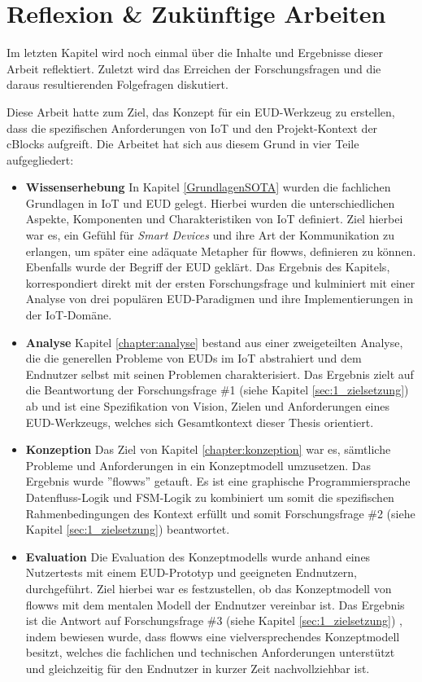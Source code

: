 \chapter{Reflexion \& Zukünftige Arbeiten}
Im letzten Kapitel wird noch einmal über die Inhalte und Ergebnisse dieser Arbeit reflektiert. Zuletzt wird das Erreichen der Forschungsfragen und die daraus resultierenden Folgefragen diskutiert.

Diese Arbeit hatte zum Ziel, das Konzept für ein \ac{EUD}-Werkzeug zu erstellen, dass die spezifischen Anforderungen von \ac{IoT} und den Projekt-Kontext der \acp{cBlock} aufgreift. Die Arbeitet hat sich aus diesem Grund in vier Teile aufgegliedert:

\begin{itemize}
    \item \textbf{Wissenserhebung} In Kapitel \ref{GrundlagenSOTA} wurden die fachlichen Grundlagen in \ac{IoT} und \ac{EUD} gelegt. Hierbei wurden die unterschiedlichen Aspekte, Komponenten und Charakteristiken von \ac{IoT} definiert. Ziel hierbei war es, ein Gefühl für \textit{Smart Devices} und ihre Art der Kommunikation zu erlangen, um später eine adäquate Metapher für flowws, definieren zu können. Ebenfalls wurde der Begriff der \ac{EUD} geklärt. Das Ergebnis des Kapitels, korrespondiert direkt mit der ersten Forschungsfrage und kulminiert mit einer Analyse von drei populären \ac{EUD}-Paradigmen und ihre Implementierungen in der \ac{IoT}-Domäne.
    \item \textbf{Analyse} Kapitel \ref{chapter:analyse} bestand aus einer zweigeteilten Analyse, die die generellen Probleme von \acp{EUD} im \ac{IoT} abstrahiert und dem Endnutzer selbst mit seinen Problemen charakterisiert. Das Ergebnis zielt auf die Beantwortung der Forschungsfrage \#1 (siehe Kapitel \ref{sec:1_zielsetzung}) ab und ist eine Spezifikation von Vision, Zielen und Anforderungen eines \ac{EUD}-Werkzeugs, welches sich Gesamtkontext dieser Thesis orientiert.
    \item \textbf{Konzeption} Das Ziel von Kapitel \ref{chapter:konzeption} war es, sämtliche Probleme und Anforderungen in ein Konzeptmodell umzusetzen. Das Ergebnis wurde ''flowws'' getauft. Es ist eine graphische Programmiersprache Datenfluss-Logik und \ac{FSM}-Logik zu kombiniert um somit die spezifischen Rahmenbedingungen des Kontext erfüllt und somit Forschungsfrage \#2 (siehe Kapitel \ref{sec:1_zielsetzung}) beantwortet.
    \item \textbf{Evaluation} Die Evaluation des Konzeptmodells wurde anhand eines Nutzertests mit einem \ac{EUD}-Prototyp und geeigneten Endnutzern, durchgeführt. Ziel hierbei war es festzustellen, ob das Konzeptmodell von flowws mit dem mentalen Modell der Endnutzer vereinbar ist. Das Ergebnis ist die Antwort auf Forschungsfrage \#3 (siehe Kapitel \ref{sec:1_zielsetzung}) , indem bewiesen wurde, dass flowws eine vielversprechendes Konzeptmodell besitzt, welches die fachlichen und technischen Anforderungen unterstützt und gleichzeitig für den Endnutzer in kurzer Zeit nachvollziehbar ist.
\end{itemize}


